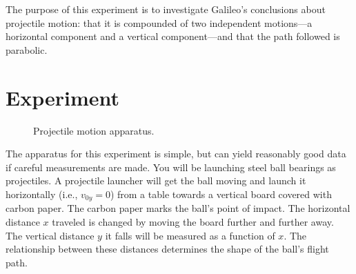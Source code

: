 The purpose of this experiment is to investigate Galileo's conclusions
about projectile motion:  that it is compounded of two
independent motions---a horizontal component and a vertical
component---and that the path followed is parabolic.

\section*{Experiment}

\begin{figure}[hbt]
\begin{center}
{}
\end{center}
 \caption{Projectile motion apparatus.  \label{fig:projectile}}
\end{figure}
The apparatus for this experiment is simple, but can yield reasonably
good data if careful measurements are made.  You will be
launching steel ball bearings as projectiles.  A projectile launcher
will
get the ball moving and launch it horizontally (i.e., $v_{0y}=0$) from a table towards a
vertical board covered with carbon paper.
The carbon paper marks the ball's point of impact.
The horizontal distance $x$ traveled is changed by moving the board
further and further away. The vertical distance $y$ it falls
will be measured as a function of $x$.  The relationship between these distances determines
the shape of the ball's flight path.

